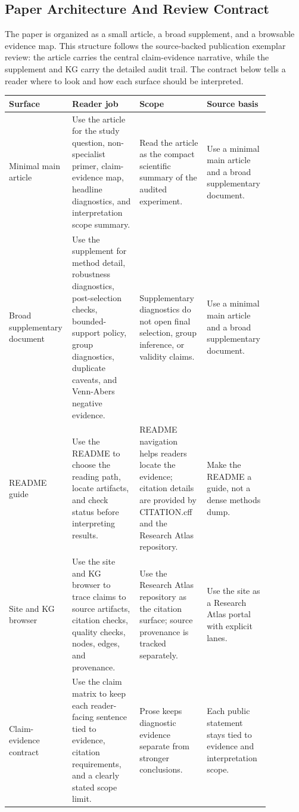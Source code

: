 \documentclass[11pt]{article}
\begin{document}
\subsection{Paper Architecture And Review Contract}

The paper is organized as a small article, a broad supplement, and a browsable evidence map. This structure follows the source-backed publication exemplar review: the article carries the central claim-evidence narrative, while the supplement and KG carry the detailed audit trail. The contract below tells a reader where to look and how each surface should be interpreted.

\begingroup
\footnotesize
\setlength{\tabcolsep}{2pt}
\renewcommand{\arraystretch}{1.18}
\begin{tabular}{@{}>{\RaggedRight\arraybackslash}p{0.180\linewidth}>{\RaggedRight\arraybackslash}p{0.250\linewidth}>{\RaggedRight\arraybackslash}p{0.250\linewidth}>{\RaggedRight\arraybackslash}p{0.190\linewidth}@{}}
\toprule
Surface & Reader job & Scope & Source basis \\
\midrule
Minimal main article & Use the article for the study question, non-specialist primer, claim-evidence map, headline diagnostics, and interpretation scope summary. & Read the article as the compact scientific summary of the audited experiment. & Use a minimal main article and a broad supplementary document. \\
Broad supplementary document & Use the supplement for method detail, robustness diagnostics, post-selection checks, bounded-support policy, group diagnostics, duplicate caveats, and Venn-Abers negative evidence. & Supplementary diagnostics do not open final selection, group inference, or validity claims. & Use a minimal main article and a broad supplementary document. \\
README guide & Use the README to choose the reading path, locate artifacts, and check status before interpreting results. & README navigation helps readers locate the evidence; citation details are provided by CITATION.cff and the Research Atlas repository. & Make the README a guide, not a dense methods dump. \\
Site and KG browser & Use the site and KG browser to trace claims to source artifacts, citation checks, quality checks, nodes, edges, and provenance. & Use the Research Atlas repository as the citation surface; source provenance is tracked separately. & Use the site as a Research Atlas portal with explicit lanes. \\
Claim-evidence contract & Use the claim matrix to keep each reader-facing sentence tied to evidence, citation requirements, and a clearly stated scope limit. & Prose keeps diagnostic evidence separate from stronger conclusions. & Each public statement stays tied to evidence and interpretation scope. \\
\bottomrule
\end{tabular}
\endgroup
\end{document}
